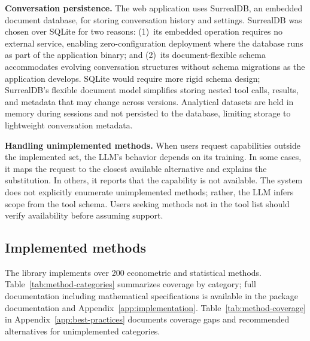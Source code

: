 \textbf{Conversation persistence.} The web application uses SurrealDB, an
embedded document database, for storing conversation history and settings.
SurrealDB was chosen over SQLite for two reasons: (1)~its embedded operation
requires no external service, enabling zero-configuration deployment where the
database runs as part of the application binary; and (2)~its document-flexible
schema accommodates evolving conversation structures without schema migrations
as the application develops. SQLite would require more rigid schema design;
SurrealDB's flexible document model simplifies storing nested tool calls,
results, and metadata that may change across versions. Analytical datasets
are held in memory during sessions and not
persisted to the database, limiting storage to lightweight conversation
metadata.

\textbf{Handling unimplemented methods.} When users request capabilities
outside the implemented set, the LLM's behavior depends on its training.
In some cases, it maps the request to the closest available alternative
and explains the substitution. In others, it reports that the capability
is not available. The system does not explicitly enumerate unimplemented
methods; rather, the LLM infers scope from the tool schema. Users seeking
methods not in the tool list should verify availability before assuming
support.

\subsection{Implemented methods}

The  library implements over 200 econometric and statistical
methods. Table~\ref{tab:method-categories} summarizes coverage by category;
full documentation including mathematical specifications is available in the
package documentation and Appendix~\ref{app:implementation}.
Table~\ref{tab:method-coverage} in Appendix~\ref{app:best-practices}
documents coverage gaps and recommended alternatives for unimplemented
categories.


